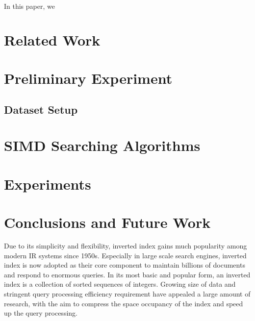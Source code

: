 \documentclass[runningheads,a4paper]{llncs}
\begin{document}
In this paper, we 
 
\section{Related Work}\label{sec:related work}

\section{Preliminary Experiment}
\subsection{Dataset Setup}
\section{SIMD Searching Algorithms}
\section{Experiments}
\section{Conclusions and Future Work}

Due to its simplicity and flexibility, inverted index gains much popularity among modern IR systems since 1950s. Especially in large scale search engines, inverted index is now adopted as their core component to maintain billions of documents and respond to enormous queries. In its most basic and popular form, an inverted index is a collection of sorted sequences of integers\cite{manning2008introduction,witten1999managing,zobel2006inverted}. Growing size of data and stringent query processing efficiency requirement have appealed a large amount of research, with the aim to compress the space occupancy of the index and speed up the query processing.
\end{document}
